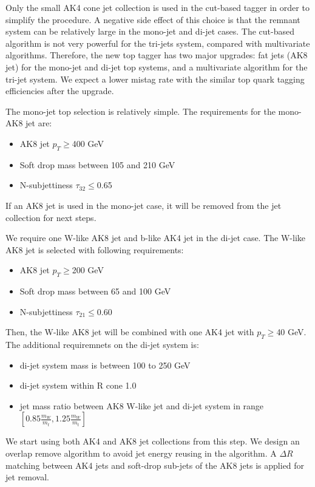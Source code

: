 Only the small AK4 cone jet collection is used in the cut-based tagger in order to simplify the procedure. A negative side effect of this choice is that the remnant system can be relatively large in the mono-jet and di-jet cases. The cut-based algorithm is not very powerful for the tri-jets system, compared with multivariate algorithms. Therefore, the new top tagger has two major upgrades: fat jets (AK8 jet) for the mono-jet and di-jet top systems, and a multivariate algorithm for the tri-jet system. We expect a lower mistag rate with the similar top quark tagging efficiencies after the upgrade. 

The mono-jet top selection is relatively simple. The requirements for the mono-AK8 jet are:
\begin{itemize}
\item AK8 jet $p_{T}\ge$400 GeV 
\item Soft drop mass between 105 and 210 GeV
\item N-subjettiness $\tau_{32}\le$0.65
\end{itemize}

If an AK8 jet is used in the mono-jet case, it will be removed from the jet collection for next steps. 

We require one W-like AK8 jet and b-like AK4 jet in the di-jet case. The W-like AK8 jet is selected with following requirements:
\begin{itemize}
\item AK8 jet $p_{T}\ge$200 GeV
\item Soft drop mass between 65 and 100 GeV
\item N-subjettiness $\tau_{21}\le$0.60
\end{itemize}

Then, the W-like AK8 jet will be combined with one AK4 jet with $p_{T}\ge$40 GeV. The additional requiremnets on the di-jet system is:
\begin{itemize}
\item di-jet system mass is between 100 to 250 GeV
\item di-jet system within R cone 1.0
\item jet mass ratio between AK8 W-like jet and di-jet system in range $[ 0.85 \frac{m_{W}}{m_{t}}, 1.25 \frac{m_{W}}{m_{t}} ]$
\end{itemize}

We start using both AK4 and AK8 jet collections from this step. We design an overlap remove algorithm to avoid jet energy reusing in the algorithm. A $\Delta R$ matching between AK4 jets and soft-drop sub-jets of the AK8 jets is applied for jet removal. 

